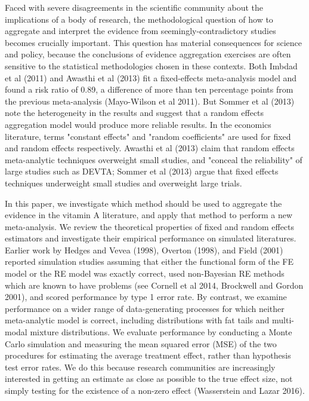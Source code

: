 \documentclass[12pt]{article}
\begin{document}
Faced with severe disagreements in the scientific community about the implications of a body of research, the methodological question of how to aggregate and interpret the evidence from seemingly-contradictory studies becomes crucially important. This question has material consequences for science and policy, because the conclusions of evidence aggregation exercises are often sensitive to the statistical methodologies chosen in these contexts. Both Imbdad et al (2011) and Awasthi et al (2013) fit a fixed-effects meta-analysis model and found a risk ratio of 0.89, a difference of more than ten percentage points from the previous meta-analysis (Mayo-Wilson et al 2011). But Sommer et al (2013) note the heterogeneity in the results and suggest that a random effects aggregation model would produce more reliable results. In the economics literature, terms "constant effects" and "random coefficients" are used for fixed and random effects respectively. Awasthi et al (2013) claim that random effects meta-analytic techniques overweight small studies, and "conceal the reliability" of large studies such as DEVTA; Sommer et al (2013) argue that fixed effects techniques underweight small studies and overweight large trials. 

In this paper, we investigate which method should be used to aggregate the evidence in the vitamin A literature, and apply that method to perform a new meta-analysis. We review the theoretical properties of fixed and random effects estimators and investigate their empirical performance on simulated literatures. 
Earlier work by Hedges and Vevea (1998), Overton (1998), and Field (2001) reported simulation studies assuming that either the functional form of the FE model or the RE model was exactly correct, used non-Bayesian RE methods which are known to have problems (see Cornell et al 2014, Brockwell and Gordon 2001), and scored performance by type 1 error rate. By contrast, we examine performance on a wider range of data-generating processes for which neither meta-analytic model is correct, including distributions with fat tails and multi-modal mixture distributions. We evaluate performance by conducting a Monte Carlo simulation and measuring the mean squared error (MSE) of the two procedures for estimating the average treatment effect, rather than hypothesis test error rates. We do this because research communities are increasingly interested in getting an estimate as close as possible to the true effect size, not simply testing for the existence of a non-zero effect (Wasserstein and Lazar 2016).
\end{document}
